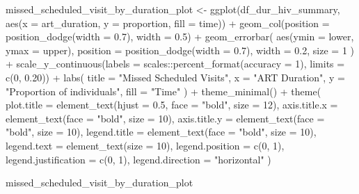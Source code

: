 \documentclass[
  letterpaper,
  DIV=11,
  numbers=noendperiod]{scrartcl}
\newenvironment{Shaded}{\begin{snugshade}}{\end{snugshade}}
\newcommand{\AttributeTok}[1]{\textcolor[rgb]{0.40,0.45,0.13}{#1}}
\newcommand{\DecValTok}[1]{\textcolor[rgb]{0.68,0.00,0.00}{#1}}
\newcommand{\FloatTok}[1]{\textcolor[rgb]{0.68,0.00,0.00}{#1}}
\newcommand{\FunctionTok}[1]{\textcolor[rgb]{0.28,0.35,0.67}{#1}}
\newcommand{\NormalTok}[1]{\textcolor[rgb]{0.00,0.23,0.31}{#1}}
\newcommand{\OtherTok}[1]{\textcolor[rgb]{0.00,0.23,0.31}{#1}}
\newcommand{\SpecialCharTok}[1]{\textcolor[rgb]{0.37,0.37,0.37}{#1}}
\newcommand{\StringTok}[1]{\textcolor[rgb]{0.13,0.47,0.30}{#1}}
\begin{document}
\begin{Shaded}
\begin{Highlighting}[]
\NormalTok{missed\_scheduled\_visit\_by\_duration\_plot }\OtherTok{\textless{}{-}} \FunctionTok{ggplot}\NormalTok{(df\_dur\_hiv\_summary, }\FunctionTok{aes}\NormalTok{(}\AttributeTok{x =}\NormalTok{ art\_duration, }\AttributeTok{y =}\NormalTok{ proportion, }\AttributeTok{fill =}\NormalTok{ time)) }\SpecialCharTok{+}
  \FunctionTok{geom\_col}\NormalTok{(}\AttributeTok{position =} \FunctionTok{position\_dodge}\NormalTok{(}\AttributeTok{width =} \FloatTok{0.7}\NormalTok{), }\AttributeTok{width =} \FloatTok{0.5}\NormalTok{) }\SpecialCharTok{+}
  \FunctionTok{geom\_errorbar}\NormalTok{(}
    \FunctionTok{aes}\NormalTok{(}\AttributeTok{ymin =}\NormalTok{ lower, }\AttributeTok{ymax =}\NormalTok{ upper),}
    \AttributeTok{position =} \FunctionTok{position\_dodge}\NormalTok{(}\AttributeTok{width =} \FloatTok{0.7}\NormalTok{),}
    \AttributeTok{width =} \FloatTok{0.2}\NormalTok{,}
    \AttributeTok{size =} \DecValTok{1}
\NormalTok{  ) }\SpecialCharTok{+}
  \FunctionTok{scale\_y\_continuous}\NormalTok{(}\AttributeTok{labels =}\NormalTok{ scales}\SpecialCharTok{::}\FunctionTok{percent\_format}\NormalTok{(}\AttributeTok{accuracy =} \DecValTok{1}\NormalTok{), }\AttributeTok{limits =} \FunctionTok{c}\NormalTok{(}\DecValTok{0}\NormalTok{, }\FloatTok{0.20}\NormalTok{)) }\SpecialCharTok{+}
  \FunctionTok{labs}\NormalTok{(}
    \AttributeTok{title =} \StringTok{"Missed Scheduled Visits"}\NormalTok{,}
    \AttributeTok{x =} \StringTok{"ART Duration"}\NormalTok{,}
    \AttributeTok{y =} \StringTok{"Proportion of individuals"}\NormalTok{,}
    \AttributeTok{fill =} \StringTok{"Time"}
\NormalTok{  ) }\SpecialCharTok{+}
  \FunctionTok{theme\_minimal}\NormalTok{() }\SpecialCharTok{+}
  \FunctionTok{theme}\NormalTok{(}
    \AttributeTok{plot.title =} \FunctionTok{element\_text}\NormalTok{(}\AttributeTok{hjust =} \FloatTok{0.5}\NormalTok{, }\AttributeTok{face =} \StringTok{"bold"}\NormalTok{, }\AttributeTok{size =} \DecValTok{12}\NormalTok{),}
    \AttributeTok{axis.title.x =} \FunctionTok{element\_text}\NormalTok{(}\AttributeTok{face =} \StringTok{"bold"}\NormalTok{, }\AttributeTok{size =} \DecValTok{10}\NormalTok{),}
    \AttributeTok{axis.title.y =} \FunctionTok{element\_text}\NormalTok{(}\AttributeTok{face =} \StringTok{"bold"}\NormalTok{, }\AttributeTok{size =} \DecValTok{10}\NormalTok{),}
    \AttributeTok{legend.title =} \FunctionTok{element\_text}\NormalTok{(}\AttributeTok{face =} \StringTok{"bold"}\NormalTok{, }\AttributeTok{size =} \DecValTok{10}\NormalTok{),}
    \AttributeTok{legend.text =} \FunctionTok{element\_text}\NormalTok{(}\AttributeTok{size =} \DecValTok{10}\NormalTok{),}
    \AttributeTok{legend.position =} \FunctionTok{c}\NormalTok{(}\DecValTok{0}\NormalTok{, }\DecValTok{1}\NormalTok{),}
    \AttributeTok{legend.justification =} \FunctionTok{c}\NormalTok{(}\DecValTok{0}\NormalTok{, }\DecValTok{1}\NormalTok{),}
    \AttributeTok{legend.direction =} \StringTok{"horizontal"}
\NormalTok{  )}

\NormalTok{missed\_scheduled\_visit\_by\_duration\_plot}
\end{Highlighting}
\end{Shaded}
\end{document}
